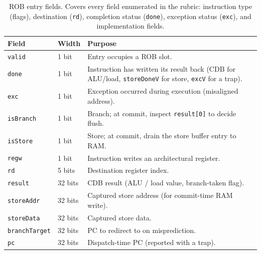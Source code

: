 \documentclass[11pt]{article}
\begin{document}
\begin{table}[h]
  \centering
  \small
  \begin{tabular}{p{3cm} p{2cm} p{9cm}}
    \toprule
    \textbf{Field}        & \textbf{Width} & \textbf{Purpose}                                                                                                     \\
    \midrule
    \texttt{valid}        & 1 bit          & Entry occupies a ROB slot.                                                                                           \\
    \texttt{done}         & 1 bit          & Instruction has written its result back (CDB for ALU/load, \texttt{storeDoneV} for store, \texttt{excV} for a trap). \\
    \texttt{exc}          & 1 bit          & Exception occurred during execution (misaligned address).                                                            \\
    \texttt{isBranch}     & 1 bit          & Branch; at commit, inspect \texttt{result[0]} to decide flush.                                                       \\
    \texttt{isStore}      & 1 bit          & Store; at commit, drain the store buffer entry to RAM.                                                               \\
    \texttt{regw}         & 1 bit          & Instruction writes an architectural register.                                                                        \\
    \texttt{rd}           & 5 bits         & Destination register index.                                                                                          \\
    \texttt{result}       & 32 bits        & CDB result (ALU / load value, branch-taken flag).                                                                    \\
    \texttt{storeAddr}    & 32 bits        & Captured store address (for commit-time RAM write).                                                                  \\
    \texttt{storeData}    & 32 bits        & Captured store data.                                                                                                 \\
    \texttt{branchTarget} & 32 bits        & PC to redirect to on misprediction.                                                                                  \\
    \texttt{pc}           & 32 bits        & Dispatch-time PC (reported with a trap).                                                                             \\
    \bottomrule
  \end{tabular}
  \caption{ROB entry fields. Covers every field enumerated in the rubric:
    instruction type (flags), destination (\texttt{rd}), completion
    status (\texttt{done}), exception status (\texttt{exc}), and
    implementation fields.}
  \label{tbl:rob_entry}
\end{table}
\end{document}
